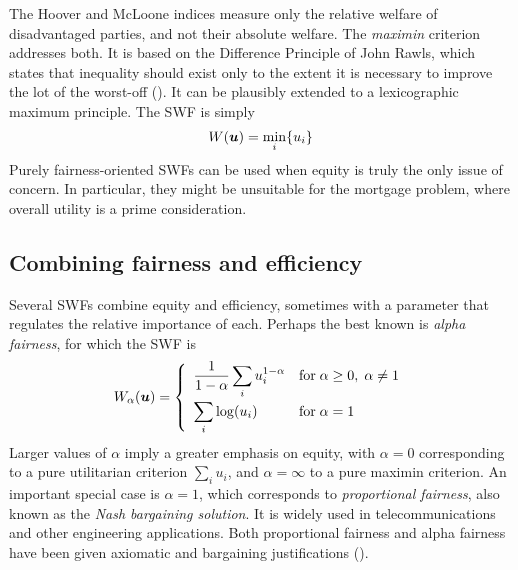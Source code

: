 \documentclass{article}[11pt]
\begin{document}
The Hoover and McLoone indices measure only the relative welfare of disadvantaged parties, and not their absolute welfare.  The {\em maximin} criterion addresses both.  It is based on the Difference Principle of John Rawls, which states that inequality should exist only to the extent it is necessary to improve the lot of the worst-off (\cite{Raw99,Fre03,RicWei99}).  It can be plausibly extended to a lexicographic maximum principle.  The SWF is simply
\[
W(\bm{u}) = \min_i\{u_i\}
\]
Purely fairness-oriented SWFs can be used when equity is truly the only issue of concern.  In particular, they might be unsuitable for the mortgage problem, where overall utility is a prime consideration.



\subsection{Combining fairness and efficiency} \label{sec:combine}

Several SWFs combine equity and efficiency, sometimes with a parameter that regulates the relative importance of each.  Perhaps the best known is {\em alpha fairness}, for which the SWF is
\[
W_{\alpha}(\bu) = \left\{
\begin{array}{ll}
{\displaystyle
\frac{1}{1-\alpha}\sum_i u_i^{1-\alpha} 
} & \mbox{for}\; \alpha\geq 0, \; \alpha\neq 1 \vspace{0.5ex} \\
{\displaystyle
\sum_i \log(u_i) 
} & \mbox{for} \;\alpha=1
\end{array}
\right.
\]
Larger values of $\alpha$ imply a greater emphasis on equity, with $\alpha=0$ corresponding to a pure utilitarian criterion $\sum_i u_i$, and $\alpha=\infty$ to a pure maximin criterion.  An important special case is $\alpha=1$, which corresponds to {\em proportional fairness}, also known as the {\em Nash bargaining solution}.  It is widely used in telecommunications and other engineering applications.  Both proportional fairness and alpha fairness have been given axiomatic and bargaining justifications (\cite{Nas50,Har77,Rub82,BinRubWol86,LanKaoChiSab2010}).  
\end{document}
